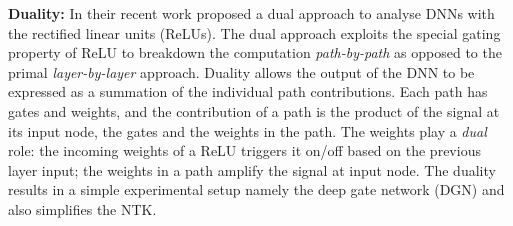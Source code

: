 \FloatBarrier
\begin{figure}[h]
\end{figure}

\textbf{Duality:} In their recent work \cite{npk} proposed a dual approach to analyse DNNs with the rectified linear units (ReLUs). The dual approach exploits the special gating property of ReLU to breakdown the computation \emph{path-by-path} as opposed to the primal \emph{layer-by-layer} approach. Duality allows the output of the DNN to be expressed as a summation of  the individual path contributions. Each path has gates and weights, and the contribution of a path is the product of the signal at its input node, the gates and the weights in the path. The weights play a \emph{dual} role: the incoming weights of a ReLU triggers it on/off based on the previous layer input; the weights in a path amplify the signal at input node. The duality results in a simple experimental setup namely the deep gate network (DGN) and also simplifies the NTK. 
\FloatBarrier
\begin{figure}[h]
\centering
{}
\end{figure}

